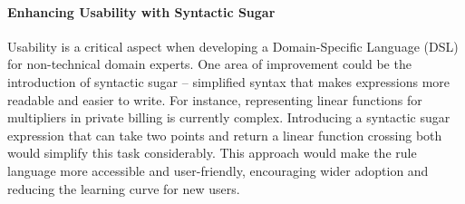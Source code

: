 \paragraph{Enhancing Usability with Syntactic Sugar}
Usability is a critical aspect when developing a Domain-Specific Language (DSL) for non-technical domain experts.
One area of improvement could be the introduction of syntactic sugar –
simplified syntax that makes expressions more readable and easier to write.
For instance, representing linear functions for multipliers in private billing is currently complex.
Introducing a syntactic sugar expression that can take two points
and return a linear function crossing both would simplify this task considerably.
This approach would make the rule language more accessible and user-friendly,
encouraging wider adoption and reducing the learning curve for new users.
